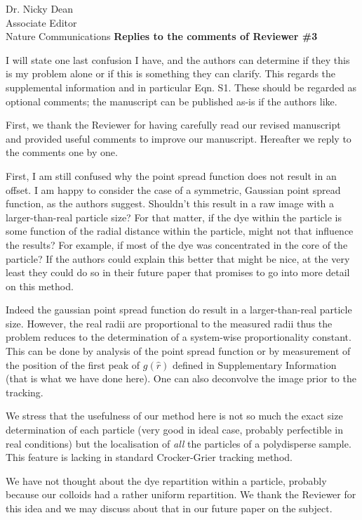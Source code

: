 \documentclass[a4paper, rebuttal, parskip=true, firsthead=false, fromemail=true, foldmarks=false]{scrlttr2}
\begin{document}
\begin{letter}{Dr. Nicky Dean\\
Associate Editor\\
Nature Communications}
\textsf{\textbf{Replies to the comments of Reviewer \#3}}

\begin{quotationi}
I will state one last confusion I have, and the authors can determine if they this is my problem alone or if this is something they can clarify. This regards the supplemental information and in particular Eqn. S1. These should be regarded as optional comments; the manuscript can be published as-is if the authors like.
\end{quotationi}

First, we thank the Reviewer for having carefully read our revised manuscript and provided useful comments to improve our manuscript. Hereafter we reply to the comments one by one.

\begin{quotationi}
First, I am still confused why the point spread function does not result in an offset. I am happy to consider the case of a symmetric, Gaussian point spread function, as the authors suggest. Shouldn't this result in a raw image with a larger-than-real particle size? For that matter, if the dye within the particle is some function of the radial distance within the particle, might not that influence the results? For example, if most of the dye was concentrated in the core of the particle? If the authors could explain this better that might be nice, at the very least they could do so in their future paper that promises to go into more detail on this method.
\end{quotationi}

Indeed the gaussian point spread function do result in a larger-than-real particle size. However, the real radii are proportional to the measured radii thus the problem reduces to the determination of a system-wise proportionality constant. This can be done by analysis of the point spread function or by measurement of the position of the first peak of $g(\hat{r})$ defined in Supplementary Information (that is what we have done here). One can also deconvolve the image prior to the tracking.

We stress that the usefulness of our method here is not so much the exact size determination of each particle (very good in ideal case, probably perfectible in real conditions) but the localisation of \emph{all} the particles of a polydisperse sample. This feature is lacking in standard Crocker-Grier tracking method.

We have not thought about the dye repartition within a particle, probably because our colloids had a rather uniform repartition. We thank the Reviewer for this idea and we may discuss about that in our future paper on the subject.


\end{letter}
\end{document}
